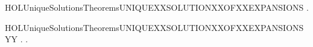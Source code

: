 \newcommand{\HOLUniqueSolutionsTheoremsUNIQUEXXSOLUTIONXXOFXXCONTRACTIONSXXLEMMA}{\UseVerbatim{HOLUniqueSolutionsTheoremsUNIQUEXXSOLUTIONXXOFXXCONTRACTIONSXXLEMMA}}
\begin{SaveVerbatim}{HOLUniqueSolutionsTheoremsUNIQUEXXSOLUTIONXXOFXXEXPANSIONS}
\HOLTokenTurnstile{} \HOLSymConst{\HOLTokenForall{}}  .
         \HOLSymConst{\HOLTokenConj{}}     \HOLSymConst{\HOLTokenConj{}}     \HOLSymConst{\HOLTokenImp{}}   
\end{SaveVerbatim}
\newcommand{\HOLUniqueSolutionsTheoremsUNIQUEXXSOLUTIONXXOFXXEXPANSIONS}{\UseVerbatim{HOLUniqueSolutionsTheoremsUNIQUEXXSOLUTIONXXOFXXEXPANSIONS}}
\begin{SaveVerbatim}{HOLUniqueSolutionsTheoremsUNIQUEXXSOLUTIONXXOFXXEXPANSIONSYY}
\HOLTokenTurnstile{} \HOLSymConst{\HOLTokenForall{}}.
         \HOLSymConst{\HOLTokenImp{}}
       \HOLSymConst{\HOLTokenForall{}} .     \HOLSymConst{\HOLTokenConj{}}     \HOLSymConst{\HOLTokenImp{}}   
\end{SaveVerbatim}
\newcommand{\HOLUniqueSolutionsTheoremsUNIQUEXXSOLUTIONXXOFXXEXPANSIONSYY}{\UseVerbatim{HOLUniqueSolutionsTheoremsUNIQUEXXSOLUTIONXXOFXXEXPANSIONSYY}}

